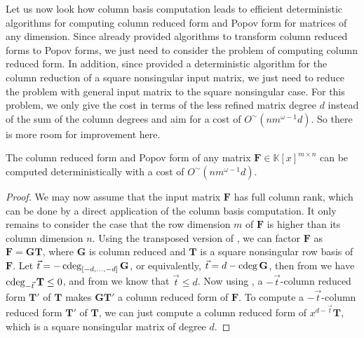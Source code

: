 Let us now look how column basis computation leads to efficient deterministic
algorithms for computing column reduced form and Popov form for matrices
of any dimension. Since \citet{SS2011} already provided algorithms
to transform column reduced forms to Popov forms, we just need to
consider the problem of computing column reduced form. In addition,
since \citet{GSSV2012} provided a deterministic algorithm for the
column reduction of a square nonsingular input matrix, we just need
to reduce the problem with general input matrix to the square nonsingular
case. For this problem, we only give the cost in terms of the less
refined matrix degree $d$ instead of the sum of the column degrees
and aim for a cost of $O^{\sim}\left(nm^{\omega-1}d\right)$. So there
is more room for improvement here.
\begin{thm}
The column reduced form and Popov form of any matrix $\mathbf{F}\in\mathbb{K}\left[x\right]^{m\times n}$
can be computed deterministically with a cost of $O^{\sim}\left(nm^{\omega-1}d\right).$\end{thm}
\begin{proof}
We may now assume that the input matrix $\mathbf{F}$ has full column
rank, which can be done by a direct application of the column basis
computation. It only remains to consider the case that the row dimension
$m$ of $\mathbf{F}$ is higher than its column dimension $n$. Using
the transposed version of , we can factor
$\mathbf{F}$ as $\mathbf{F}=\mathbf{G}\mathbf{T}$, where $\mathbf{G}$
is column reduced and $\mathbf{T}$ is a square nonsingular row basis
of $\mathbf{F}$. Let $\vec{t}=-\cdeg_{\left[-d,\dots,-d\right]}\mathbf{G}$,
or equivalently, $\vec{t}=d-\cdeg\mathbf{G}$, then from 
we have $\cdeg_{-\vec{t}}\mathbf{T}\le0$, and from 
we know that $\vec{t}\le d$. Now using ,
a $-\vec{t}$-column reduced form $\mathbf{T}'$ of $\mathbf{T}$
makes $\mathbf{G}\mathbf{T}'$ a column reduced form of $\mathbf{F}$.
To compute a $-\vec{t}$-column reduced form $\mathbf{T}'$ of $\mathbf{T}$,
we can just compute a column reduced form of $x^{d-\vec{t}}\mathbf{T}$,
which is a square nonsingular matrix of degree $d$.\end{proof}

